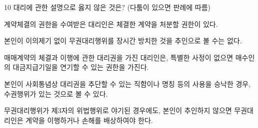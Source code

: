 \begin{question}{10}
대리에 관한 설명으로 옳지 않은 것은? (다툼이 있으면 판례에 따름)
\begin{choices}
  \item 계약체결의 권한을 수여받은 대리인은 체결한 계약을 처분할 권한이 있다.
  \item 본인이 이의제기 없이 무권대리행위를 장시간 방치한 것을 추인으로 볼 수는 없다.
  \item 매매계약의 체결과 이행에 관한 대리권을 가진 대리인은, 특별한 사정이 없으면 매수인의 대금지급기일을 연기할 수 있는 권한을 가진다.
  \item 본인이 사회통념상 대리권을 추단할 수 있는 직함이나 명칭 등의 사용을 승낙한 경우, 수권행위가 있는 것으로 볼 수 있다.
  \item 무권대리행위가 제3자의 위법행위로 야기된 경우에도, 본인이 추인하지 않으면 무권대리인은 계약을 이행하거나 손해를 배상하여야 한다.
\end{choices}
\end{question}

